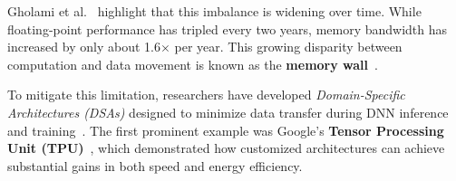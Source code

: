 Gholami et al.~\cite{gholami2024ai} highlight that this imbalance is widening over time. While floating-point performance has tripled every two years, memory bandwidth has increased by only about 1.6$\times$ per year.
This growing disparity between computation and data movement is known as the \textbf{memory wall}~\cite{gholami2024ai}.

To mitigate this limitation, researchers have developed \textit{Domain-Specific Architectures (DSAs)} designed to minimize data transfer during DNN inference and training~\cite{Hooker2021, Dean2018}. The first prominent example was Google’s \textbf{Tensor Processing Unit (TPU)}~\cite{Jouppi2017}, which demonstrated how customized architectures can achieve substantial gains in both speed and energy efficiency.

\newpage
